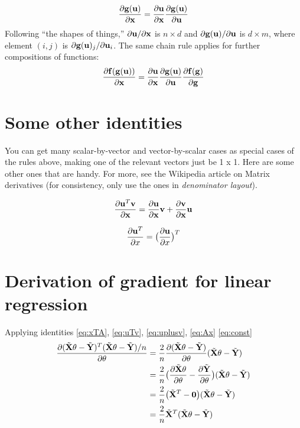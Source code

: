 \begin{equation}\frac{\partial {\bf g}({\bf u})}{\partial {\bf x}} = \frac{\partial
    {\bf u}}{\partial {\bf x}}\frac{\partial {\bf g}({\bf u})}{\partial
    {\bf u}}\end{equation}
Following ``the shapes of things,''
$\partial {\bf u} / \partial {\bf x}$ is $n \times d$ and $\partial {\bf g}({\bf u})
  / \partial {\bf u}$ is $d \times m$, where element $(i,j)$ is $\partial
  {\bf g}({\bf u})_j / \partial {\bf u}_i$.
The same chain rule applies for further compositions of functions:
\begin{equation}\frac{\partial {\bf f}({\bf g}({\bf u}))}{\partial {\bf x}} = \frac{\partial
    {\bf u}}{\partial {\bf x}}\frac{\partial {\bf g}({\bf u})}{\partial {\bf u}}
  \frac{\partial {\bf f}({\bf g})}{\partial {\bf g}}\end{equation}


\section{Some other identities}
You can get many scalar-by-vector and vector-by-scalar cases as special
cases of the rules above, making one of the relevant vectors just be
1 x 1.  Here are some other ones that are handy.  For more, see the
Wikipedia article on Matrix derivatives (for consistency, only use
the ones in {\em denominator layout}).

\begin{equation}
  \frac{\partial {\bf u}^T {\bf v}}{\partial {\bf x}} = \frac{\partial
    {\bf u}}{\partial {\bf x}} {\bf v} + \frac{\partial {\bf v}}{\partial {\bf x}} {\bf u}
  \label{eq:uTv}
\end{equation}

\begin{equation}
  \frac{\partial {\bf u}^T}{\partial x} = \big(\frac{\partial
    {\bf u}}{\partial x}\big)^T
  \label{eq:uT}
\end{equation}



\section{Derivation of gradient for linear regression}
\label{app:matrix-gradient}

\newcommand{\xmt}{\tilde{\bf X}}
\newcommand{\ymt}{\tilde{\bf Y}}


Applying identities \ref{eq:xTA}, \ref{eq:uTv}, \ref{eq:uplusv}, \ref{eq:Ax}
\ref{eq:const}
\begin{align*}
  \frac{\partial (\xmt \theta - \ymt)^T(\xmt \theta - \ymt)/n}{\partial
  \theta} & = \frac{2}{n} \frac{\partial(\xmt \theta - \ymt)}{\partial
  \theta}(\xmt \theta - \ymt)                                           \\
          & = \frac{2}{n} \big(\frac{\partial\xmt \theta}{\partial
    \theta}-\frac{\partial \ymt}{\partial
  \theta}\big)(\xmt \theta - \ymt)                                      \\
          & = \frac{2}{n} \big(\xmt^T -{\bf 0}\big)(\xmt \theta - \ymt) \\
          & = \frac{2}{n} \xmt^T (\xmt \theta - \ymt)                   \\
\end{align*}


